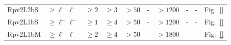 \begin{table}[htp]
{\begin{tabular}{llllllllll}
            Rpv2L2bS      & $\ge \ell^{-}\ell^{-}$                   & $\ge 2$               & $\ge 3$             & $> 50$                        & -             & $> 1200$           & -                       & -     & Fig.~\ref{}\\
            Rpv2L1bS      & $\ge \ell^{-}\ell^{-}$                   & $\ge 1$               & $\ge 4$             & $> 50$                        & -             & $> 1200$           & -                       & -     & Fig.~\ref{}\\
            Rpv2L1bM      & $\ge \ell^{-}\ell^{-}$                   & $\ge 2$               & $\ge 4$             & $> 50$                        & -             & $> 1800$           & -                       & -     & Fig.~\ref{}\\
            \hline
            \hline
        \end{tabular}
    }
    \caption{}
    \label{tab:app_}
\end{table}%

